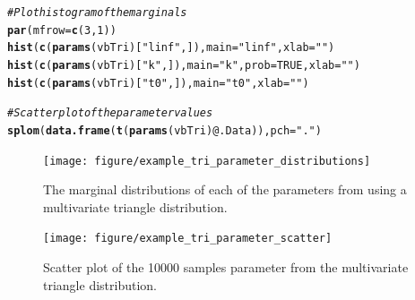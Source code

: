 \documentclass[a4paper,english,10pt]{article}\usepackage[]{graphicx}\usepackage[]{color}
\makeatletter
\newcommand{\hlnum}[1]{\textcolor[rgb]{0.686,0.059,0.569}{#1}}%
\newcommand{\hlstr}[1]{\textcolor[rgb]{0.192,0.494,0.8}{#1}}%
\newcommand{\hlcom}[1]{\textcolor[rgb]{0.678,0.584,0.686}{\textit{#1}}}%
\newcommand{\hlopt}[1]{\textcolor[rgb]{0,0,0}{#1}}%
\newcommand{\hlstd}[1]{\textcolor[rgb]{0.345,0.345,0.345}{#1}}%
\newcommand{\hlkwc}[1]{\textcolor[rgb]{0.333,0.667,0.333}{#1}}%
\newcommand{\hlkwd}[1]{\textcolor[rgb]{0.737,0.353,0.396}{\textbf{#1}}}%
\newenvironment{kframe}{%
 \def\at@end@of@kframe{}%
 \ifinner\ifhmode%
  \def\at@end@of@kframe{\end{minipage}}%
  \begin{minipage}{\columnwidth}%
 \fi\fi%
 \def\FrameCommand##1{\hskip\@totalleftmargin \hskip-\fboxsep
 \colorbox{shadecolor}{##1}\hskip-\fboxsep
     \hskip-\linewidth \hskip-\@totalleftmargin \hskip\columnwidth}%
 \MakeFramed {\advance\hsize-\width
   \@totalleftmargin\z@ \linewidth\hsize
   \@setminipage}}%
 {\par\unskip\endMakeFramed%
 \at@end@of@kframe}
\newenvironment{knitrout}{}{} %
\makeatother
\begin{document}
\begin{knitrout}
\color{fgcolor}\begin{kframe}
\begin{alltt}
\hlcom{# Plot histogram of the marginals}
\hlkwd{par}\hlstd{(}\hlkwc{mfrow} \hlstd{=} \hlkwd{c}\hlstd{(}\hlnum{3}\hlstd{,} \hlnum{1}\hlstd{))}
\hlkwd{hist}\hlstd{(}\hlkwd{c}\hlstd{(}\hlkwd{params}\hlstd{(vbTri)[}\hlstr{"linf"}\hlstd{, ]),} \hlkwc{main} \hlstd{=} \hlstr{"linf"}\hlstd{,} \hlkwc{xlab} \hlstd{=} \hlstr{""}\hlstd{)}
\hlkwd{hist}\hlstd{(}\hlkwd{c}\hlstd{(}\hlkwd{params}\hlstd{(vbTri)[}\hlstr{"k"}\hlstd{, ]),} \hlkwc{main} \hlstd{=} \hlstr{"k"}\hlstd{,} \hlkwc{prob} \hlstd{=} \hlnum{TRUE}\hlstd{,} \hlkwc{xlab} \hlstd{=} \hlstr{""}\hlstd{)}
\hlkwd{hist}\hlstd{(}\hlkwd{c}\hlstd{(}\hlkwd{params}\hlstd{(vbTri)[}\hlstr{"t0"}\hlstd{, ]),} \hlkwc{main} \hlstd{=} \hlstr{"t0"}\hlstd{,} \hlkwc{xlab} \hlstd{=} \hlstr{""}\hlstd{)}
\end{alltt}
\end{kframe}
\end{knitrout}


\begin{knitrout}
\color{fgcolor}\begin{kframe}
\begin{alltt}
\hlcom{# Scatter plot of the parameter values}
\hlkwd{splom}\hlstd{(}\hlkwd{data.frame}\hlstd{(}\hlkwd{t}\hlstd{(}\hlkwd{params}\hlstd{(vbTri)}\hlopt{@}\hlkwc{.Data}\hlstd{)),} \hlkwc{pch} \hlstd{=} \hlstr{"."}\hlstd{)}
\end{alltt}
\end{kframe}
\end{knitrout}


\begin{figure}[h]
\begin{knitrout}
\color{fgcolor}

{\centering \texttt{[image: figure/example\_tri\_parameter\_distributions]} 

}



\end{knitrout}

\caption{The marginal distributions of each of the parameters from using a multivariate triangle distribution.}
\label{fig:plot_tri_params}
\end{figure}


\begin{figure}[h]
\begin{knitrout}
\color{fgcolor}

{\centering \texttt{[image: figure/example\_tri\_parameter\_scatter]} 

}



\end{knitrout}

\caption{Scatter plot of the 10000 samples parameter from the multivariate triangle distribution.}
\label{fig:plot_tri_scatter}
\end{figure}
\end{document}
